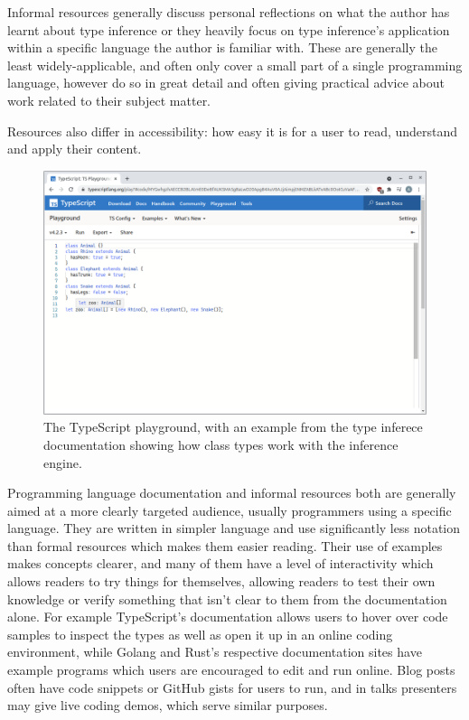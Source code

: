 \documentclass[a4paper,fleqn,oneside,12pt]{report}
\begin{document}
Informal resources generally discuss personal reflections on what the author has learnt about type inference or they heavily focus on type inference's application within a specific language the author is familiar with. These are generally the least widely-applicable, and often only cover a small part of a single programming language, however do so in great detail and often giving practical advice about work related to their subject matter.

Resources also differ in accessibility: how easy it is for a user to read, understand and apply their content.

\begin{figure}[h!]
  \centering
  \includegraphics[width=\linewidth]{images/image8.png}
  \caption{The TypeScript playground, with an example from the type inferece documentation showing how class types work with the inference engine.}
\end{figure}

Programming language documentation and informal resources both are generally aimed at a more clearly targeted audience, usually programmers using a specific language. They are written in simpler language and use significantly less notation than formal resources which makes them easier reading. Their use of examples makes concepts clearer, and many of them have a level of interactivity which allows readers to try things for themselves, allowing readers to test their own knowledge or verify something that isn’t clear to them from the documentation alone. For example TypeScript's documentation allows users to hover over code samples to inspect the types as well as open it up in an online coding environment, while Golang and Rust's respective documentation sites have example programs which users are encouraged to edit and run online. Blog posts often have code snippets or GitHub gists for users to run, and in talks presenters may give live coding demos, which serve similar purposes.
\end{document}
